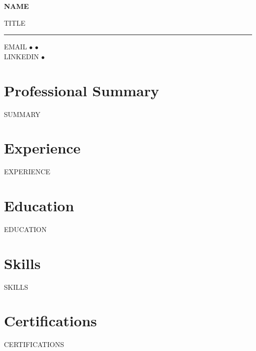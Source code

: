 \documentclass[11pt,a4paper]{article}
\begin{document}
{\Huge\bfseries\color{primary} {{NAME}}}

\vspace{0.5em}
{\large\color{secondary} {{TITLE}}}

\vspace{1em}
\hrule height 2pt
\vspace{0.5em}

\begin{center}
{{EMAIL}} \quad $\bullet$  \quad $\bullet$ \\
{{LINKEDIN}} \quad $\bullet$ 
\end{center}

\vspace{1em}

\section*{Professional Summary}
{{SUMMARY}}

\section*{Experience}
{{EXPERIENCE}}

\section*{Education}
{{EDUCATION}}

\section*{Skills}
{{SKILLS}}

\section*{Certifications}
{{CERTIFICATIONS}}
\end{document}
